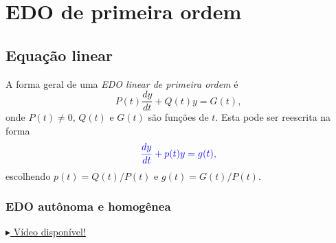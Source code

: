 
\chapter{EDO de primeira ordem}\label{cap_edo1ordem}
\thispagestyle{fancy}

\section{Equação linear}\label{cap_edo1ordem_sec_eqlinear}

A forma geral de uma \emph{EDO linear de primeira ordem} é
\begin{equation}
  P(t)\frac{dy}{dt} + Q(t)y = G(t),
\end{equation}
onde $P(t) \neq 0$, $Q(t)$ e $G(t)$ são funções de $t$. Esta pode ser reescrita na forma
\begin{equation}
  \color{blue}{\frac{dy}{dt} + p(t)y = g(t)},
\end{equation}
escolhendo $p(t) = Q(t)/P(t)$ e $g(t) = G(t)/P(t)$.

\subsection{EDO autônoma e homogênea}

\begin{flushright}
  \href{https://archive.org/details/metodo-de-solucao-edo-ordem-1-linear-coeficientes-constantes-homogenea_20200421}{$\blacktriangleright$ Vídeo disponível!}
\end{flushright}

